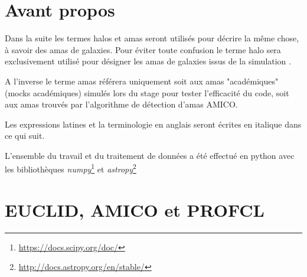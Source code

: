 \documentclass[a4paper,11pt]{article}
\numberwithin{equation}{section}
\begin{document}
\section*{Avant propos}
Dans la suite les termes halos et amas seront utilisés pour décrire la même chose, à savoir des amas de galaxies. Pour éviter toute confusion le terme halo sera exclusivement utilisé pour désigner les amas de galaxies issus de la simulation \cite{Catalog_EUCLID}.\par
A l'inverse le terme amas référera uniquement soit aux amas "académiques" (mocks académiques) simulés lors du stage pour tester l'efficacité du code, soit aux amas trouvés par l'algorithme de détection d'amas AMICO. \par
Les expressions latines et la terminologie en anglais seront écrites en italique dans ce qui suit.\newline \par

L'ensemble du travail et du traitement de données a été effectué en python avec les bibliothèques \textit{numpy}\footnote{\url{https://docs.scipy.org/doc/}} et \textit{astropy}\footnote{\url{http://docs.astropy.org/en/stable/}}


\newpage

\section{EUCLID, AMICO et PROFCL}
\end{document}

